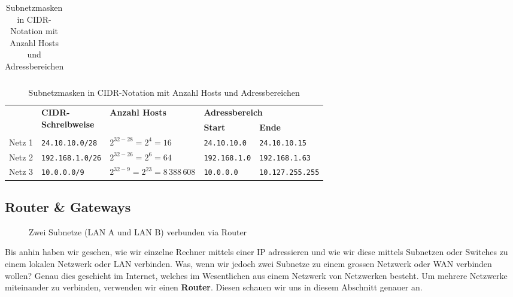 \begin{myexercise}
\begin{table}[H]
\begin{tabular}{l||m{2.5cm}|m{2.25cm}|m{2.5cm}|m{2.5cm}}
			\end{tabular}
			\caption{Subnetzmasken in CIDR-Notation mit Anzahl Hosts und Adressbereichen}
		\end{table}
	\begin{myanswer}
		\begin{table}[H]
			\centering
			\begin{tabular}{l||l|m{2.5cm}|l|l}
								&  \multirow{2}{2cm}{\textbf{\gls{CIDR}-\newline Schreibweise}}&\multirow{2}{2.25cm}{\textbf{Anzahl Hosts}} & \multicolumn{2}{l}{\textbf{Adressbereich}} \\\cmidrule{4-5}
																& & & \textbf{Start} & \textbf{Ende} \\
												\midrule\midrule
												Netz 1 & \texttt{24.10.10.0/28} & $2^{32-28} = 2^{4} = 16$ & \texttt{24.10.10.0} & \texttt{24.10.10.15} \\\midrule
												Netz 2  & \texttt{192.168.1.0/26} & $2^{32-26} = 2^{6} = 64$& \texttt{192.168.1.0}           & \texttt{192.168.1.63}         \\
												\midrule
												Netz 3 & \texttt{10.0.0.0/9} & $2^{32-9} = 2^{23} = 8\,388\,608$     & \texttt{10.0.0.0}              & \texttt{10.127.255.255}       \\
												
			\end{tabular}
			\caption{Subnetzmasken in CIDR-Notation mit Anzahl Hosts und Adressbereichen}
		\end{table}
	\end{myanswer}
\end{myexercise}

\subsection{Router \& Gateways}
\begin{figure}[H]
	\centering
	
	\caption{Zwei Subnetze (\gls{LAN} A und \gls{LAN} B) verbunden via Router}
	\label{fig:router-subnetze}
\end{figure}
Bis anhin haben wir gesehen, wie wir einzelne Rechner mittels einer IP adressieren und wie wir diese mittels Subnetzen oder Switches zu einem lokalen Netzwerk oder \gls{LAN} verbinden. Was, wenn wir jedoch zwei Subnetze zu einem grossen Netzwerk oder \gls{WAN} verbinden wollen? Genau dies geschieht im Internet, welches im Wesentlichen aus einem Netzwerk von Netzwerken besteht. Um mehrere Netzwerke miteinander zu verbinden, verwenden wir einen \textbf{Router}. Diesen schauen wir uns in diesem Abschnitt genauer an.

